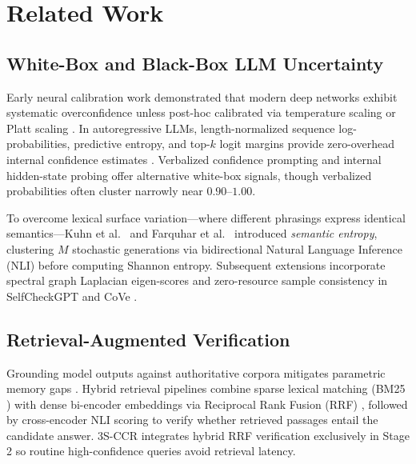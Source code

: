 \documentclass[10pt,conference]{IEEEtran}
\begin{document}
\section{Related Work}
\subsection{White-Box and Black-Box LLM Uncertainty}
Early neural calibration work demonstrated that modern deep networks exhibit systematic overconfidence unless post-hoc calibrated via temperature scaling or Platt scaling \cite{guo2017calibration,platt1999probabilistic,niculescu2005predicting,kull2019beyond}. In autoregressive LLMs, length-normalized sequence log-probabilities, predictive entropy, and top-$k$ logit margins provide zero-overhead internal confidence estimates \cite{kadavath2022language,malinin2021uncertainty,xiao2021hallucination,si2023prompting}. Verbalized confidence prompting \cite{lin2022teaching,tian2023just,xiong2024can} and internal hidden-state probing \cite{azaria2023internal,burns2023discovering} offer alternative white-box signals, though verbalized probabilities often cluster narrowly near $0.90\text{--}1.00$.

To overcome lexical surface variation—where different phrasings express identical semantics—Kuhn et al.\ \cite{kuhn2023semantic} and Farquhar et al.\ \cite{farquhar2024detecting} introduced \emph{semantic entropy}, clustering $M$ stochastic generations via bidirectional Natural Language Inference (NLI) before computing Shannon entropy. Subsequent extensions incorporate spectral graph Laplacian eigen-scores \cite{lin2024generating} and zero-resource sample consistency in SelfCheckGPT \cite{manakul2023selfcheckgpt} and CoVe \cite{dhuliawala2024chain}.

\subsection{Retrieval-Augmented Verification}
Grounding model outputs against authoritative corpora mitigates parametric memory gaps \cite{lewis2020retrieval,guu2020realm,izacard2021leveraging,borgeaud2022improving}. Hybrid retrieval pipelines combine sparse lexical matching (BM25 \cite{robertson2009probabilistic}) with dense bi-encoder embeddings \cite{karpukhin2020dense} via Reciprocal Rank Fusion (RRF) \cite{cormack2009rrf}, followed by cross-encoder NLI scoring \cite{williams2018broad,bowman2015large,honovich2022true,min2023factscore,asai2024selfrag} to verify whether retrieved passages entail the candidate answer. 3S-CCR integrates hybrid RRF verification exclusively in Stage 2 so routine high-confidence queries avoid retrieval latency.
\end{document}
